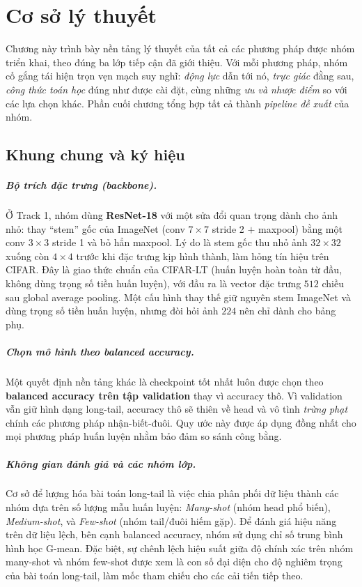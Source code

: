 \chapter{Cơ sở lý thuyết}
\label{chap:theory}

Chương này trình bày nền tảng lý thuyết của tất cả các phương pháp được nhóm triển khai, theo đúng
ba lớp tiếp cận đã giới thiệu. Với mỗi phương pháp, nhóm cố gắng tái hiện trọn vẹn mạch suy nghĩ:
\emph{động lực} dẫn tới nó, \emph{trực giác} đằng sau, \emph{công thức toán học} đúng như được cài
đặt, cùng những \emph{ưu và nhược điểm} so với các lựa chọn khác. Phần cuối chương tổng hợp tất cả
thành \emph{pipeline đề xuất} của nhóm.

\section{Khung chung và ký hiệu}
\label{sec:common}

\paragraph{Bộ trích đặc trưng (backbone).} Ở Track 1, nhóm dùng \textbf{ResNet-18} với một sửa đổi
quan trọng dành cho ảnh nhỏ: thay ``stem'' gốc của ImageNet (conv $7\times7$ stride 2 $+$ maxpool)
bằng một conv $3\times3$ stride 1 và bỏ hẳn maxpool. Lý do là stem gốc thu nhỏ ảnh $32\times32$
xuống còn $4\times4$ trước khi đặc trưng kịp hình thành, làm hỏng tín hiệu trên CIFAR. Đây là giao
thức chuẩn của CIFAR-LT (huấn luyện hoàn toàn từ đầu, không dùng trọng số tiền huấn luyện), với đầu
ra là vector đặc trưng $512$ chiều sau global average pooling. Một cấu hình thay thế giữ nguyên stem
ImageNet và dùng trọng số tiền huấn luyện, nhưng đòi hỏi ảnh $224$ nên chỉ dành cho bảng phụ.

\paragraph{Chọn mô hình theo balanced accuracy.} Một quyết định nền tảng khác là checkpoint tốt nhất
luôn được chọn theo \textbf{balanced accuracy trên tập validation} thay vì accuracy thô. Vì
validation vẫn giữ hình dạng long-tail, accuracy thô sẽ thiên về head và vô tình \emph{trừng phạt}
chính các phương pháp nhận-biết-đuôi. Quy ước này được áp dụng đồng nhất cho mọi phương pháp huấn
luyện nhằm bảo đảm so sánh công bằng.

\paragraph{Không gian đánh giá và các nhóm lớp.} Cơ sở để lượng hóa bài toán long-tail là việc chia phân phối dữ liệu thành các nhóm dựa trên số lượng mẫu huấn luyện: \emph{Many-shot} (nhóm head phổ biến), \emph{Medium-shot}, và \emph{Few-shot} (nhóm tail/đuôi hiếm gặp). Để đánh giá hiệu năng trên dữ liệu lệch, bên cạnh balanced accuracy, nhóm sử dụng chỉ số trung bình hình học G-mean. Đặc biệt, sự chênh lệch hiệu suất giữa độ chính xác trên nhóm many-shot và nhóm few-shot được xem là con số đại diện cho độ nghiêm trọng của bài toán long-tail, làm mốc tham chiếu cho các cải tiến tiếp theo.

